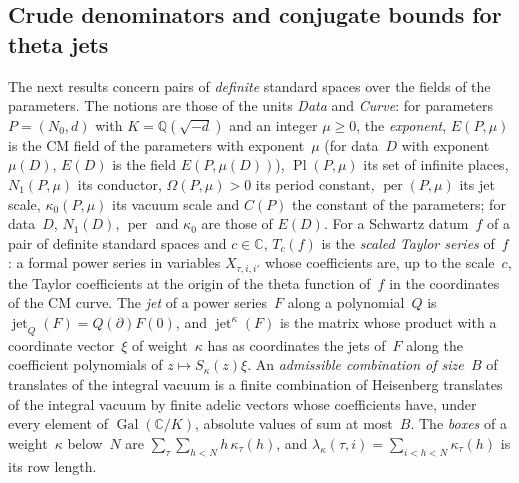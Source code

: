 \documentclass[11pt,a4paper]{article}
\newcommand{\kw}[1]{\emph{#1}}
\newcommand{\m}[1]{\mbox{$#1$}}        %
\theoremstyle{plainx}
\theoremstyle{uprightx}
\newcommand{\CC}{\mathbb{C}}
\newcommand{\EPm}{E(P,\mu)}
\newcommand{\PlPm}{\operatorname{Pl}(P,\mu)}
\newcommand{\NPm}{N_1(P,\mu)}
\begin{document}
\subsection*{Crude denominators and conjugate bounds for theta jets}
The next results concern pairs of \emph{definite} standard spaces over the fields of the parameters. The notions are
those of the units \emph{Data} and \emph{Curve}: for parameters \m{P=(N_0,d)} with \m{K=\mathbb{Q}(\sqrt{-d})} and an
integer \m{\mu\ge0}, the \kw{exponent}, \m{\EPm} is the CM field of the parameters with exponent~$\mu$ (for
data~$D$ with exponent \m{\mu(D)}, \m{E(D)} is the field \m{E(P,\mu(D))}), \m{\PlPm} its set of infinite places,
\m{\NPm} its conductor, \m{\Omega(P,\mu)>0} its period constant, \m{\operatorname{per}(P,\mu)} its jet scale,
\m{\kappa_0(P,\mu)} its vacuum scale and \m{C(P)} the constant of the parameters; for data~$D$, \m{N_1(D)},
\m{\operatorname{per}} and \m{\kappa_0} are those of \m{E(D)}. For a Schwartz
datum~$f$ of a pair of definite standard spaces and \m{c\in\CC}, \m{T_c(f)} is the \kw{scaled Taylor series} of~$f$: a
formal power series in variables \m{X_{\tau,i,i'}} whose coefficients are, up to the scale~$c$, the Taylor
coefficients at the origin of the theta function of~$f$ in the coordinates of the CM curve. The \kw{jet} of a power
series~$F$ along a polynomial~$Q$ is \m{\operatorname{jet}_Q(F)=Q(\partial)F(0)}, and \m{\operatorname{jet}^{\kappa}(F)} is the
matrix whose product with a coordinate vector~$\xi$ of weight~$\kappa$ has as coordinates the jets of~$F$ along
the coefficient polynomials of \m{z\mapsto S_\kappa(z)\xi}. An \kw{admissible combination of size~$B$} of translates of
the integral vacuum is a finite combination of Heisenberg translates of the integral vacuum by finite adelic vectors
whose coefficients have, under every element of \m{\operatorname{Gal}(\CC/K)}, absolute values of sum at most~$B$. The
\kw{boxes} of a weight~$\kappa$ below~$N$ are \m{\sum_\tau\sum_{h<N}h\,\kappa_\tau(h)}, and
\m{\lambda_\kappa(\tau,i)=\sum_{i<h<N}\kappa_\tau(h)} is its row length.
\end{document}
